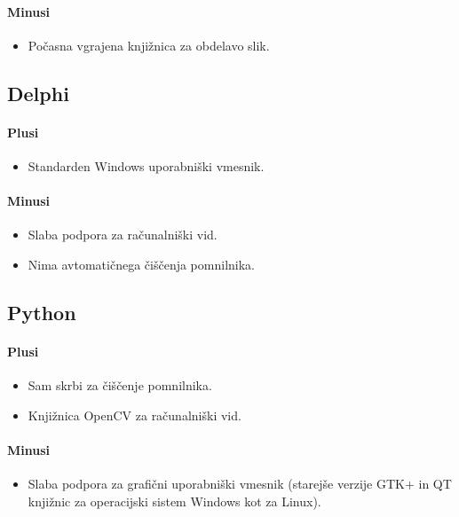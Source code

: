\documentclass[oneside, a4paper, 12pt]{book}
\begin{document}
\paragraph{Minusi}
\begin{itemize}
\item Počasna vgrajena knjižnica za obdelavo slik.
\end{itemize}


\subsection{Delphi}
\paragraph{Plusi}
\begin{itemize}
\item Standarden Windows uporabniški vmesnik.
\end{itemize}
\paragraph{Minusi}
\begin{itemize}
\item Slaba podpora za računalniški vid.
\item Nima avtomatičnega čiščenja pomnilnika.
\end{itemize}

\subsection{Python}
\paragraph{Plusi}
\begin{itemize}
\item Sam skrbi za čiščenje pomnilnika.
\item Knjižnica OpenCV za računalniški vid.
\end{itemize}
\paragraph{Minusi}
\begin{itemize}
\item Slaba podpora za grafični uporabniški vmesnik (starejše verzije GTK+ in QT knjižnic za operacijski sistem Windows kot za Linux).
\end{itemize}
\end{document}
